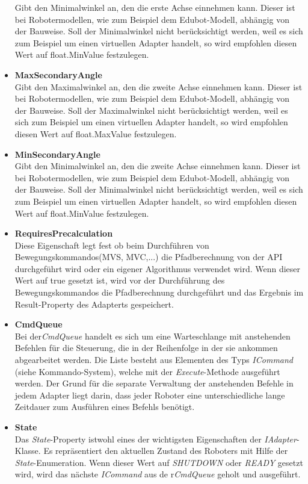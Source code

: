 \begin{itemize}
Gibt den Minimalwinkel an, den die erste Achse einnehmen kann. Dieser ist bei Robotermodellen, wie zum Beispiel dem Edubot-Modell, abhängig von der Bauweise. Soll der Minimalwinkel nicht berücksichtigt werden, weil es sich zum Beispiel um einen virtuellen Adapter handelt, so wird empfohlen diesen Wert auf float.MinValue festzulegen.
\item \textbf{MaxSecondaryAngle}\\
Gibt den Maximalwinkel an, den die zweite Achse einnehmen kann. Dieser ist bei Robotermodellen, wie zum Beispiel dem Edubot-Modell, abhängig von der Bauweise. Soll der Maximalwinkel nicht berücksichtigt werden, weil es sich zum Beispiel um einen virtuellen Adapter handelt, so wird empfohlen diesen Wert auf float.MaxValue festzulegen.
\item \textbf{MinSecondaryAngle}\\
Gibt den Minimalwinkel an, den die zweite Achse einnehmen kann. Dieser ist bei Robotermodellen, wie zum Beispiel dem Edubot-Modell, abhängig von der Bauweise. Soll der Minimalwinkel nicht berücksichtigt werden, weil es sich zum Beispiel um einen virtuellen Adapter handelt, so wird empfohlen diesen Wert auf float.MinValue festzulegen.
\item \textbf{RequiresPrecalculation}\\
Diese Eigenschaft legt fest ob beim Durchführen von Bewegungskommandos(MVS, MVC,...) die Pfadberechnung von der API durchgeführt wird oder ein eigener Algorithmus verwendet wird. Wenn dieser Wert auf true gesetzt ist, wird vor der Durchführung des Bewegungskommandos die Pfadberechnung durchgeführt und das Ergebnis im Result-Property des Adapterts gespeichert.
\item \textbf{CmdQueue}\\
Bei der\textit{CmdQueue} handelt es sich um eine Warteschlange mit anstehenden Befehlen für die Steuerung, die in der Reihenfolge in der sie ankommen abgearbeitet werden. Die Liste besteht aus Elementen des Typs \textit{ICommand} (siehe Kommando-System), welche mit der \textit{Execute}-Methode ausgeführt werden.
Der Grund für die separate Verwaltung der anstehenden Befehle in jedem Adapter liegt darin, dass jeder Roboter eine unterschiedliche lange Zeitdauer zum Ausführen eines Befehls benötigt.
\item \textbf{State}\\
Das \textit{State}-Property istwohl eines der wichtigsten Eigenschaften der \textit{IAdapter}-Klasse. Es repräsentiert den aktuellen Zustand des Roboters mit Hilfe der \textit{State}-Enumeration. Wenn dieser Wert auf \textit{SHUTDOWN} oder  \textit{READY} gesetzt wird, wird das nächste \textit{ICommand} aus de r\textit{CmdQueue} geholt und ausgeführt.
\end{itemize}

